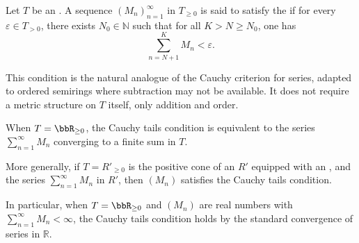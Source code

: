 \begin{definition} \label{definition:cauchy_tails_condition_for_series_in_an_ordered_semiring}
    Let $T$ be an . A sequence $(M_n)_{n=1}^\infty$ in $T_{\ge 0}$ is said to satisfy the  if for every $\varepsilon \in T_{>0}$, there exists $N_0 \in \mathbb{N}$ such that for all $K > N \ge N_0$, one has
    $$\sum_{n=N+1}^K M_n < \varepsilon.$$

    This condition is the natural analogue of the Cauchy criterion for series, adapted to ordered semirings where subtraction may not be available. It does not require a metric structure on $T$ itself, only addition and order.

    When $T = \bbR_{\ge 0}$, the Cauchy tails condition is equivalent to the series $\sum_{n=1}^\infty M_n$ converging to a finite sum in $T$.

    More generally, if $T = R'_{\ge 0}$ is the positive cone of an  $R'$ equipped with an , and the series $\sum_{n=1}^\infty M_n$  in $R'$, then $(M_n)$ satisfies the Cauchy tails condition. 

    

    In particular, when $T = \bbR_{\ge 0}$ and $(M_n)$ are real numbers with $\sum_{n=1}^\infty M_n < \infty$, the Cauchy tails condition holds by the standard convergence of series in $\mathbb{R}$.
\end{definition}
